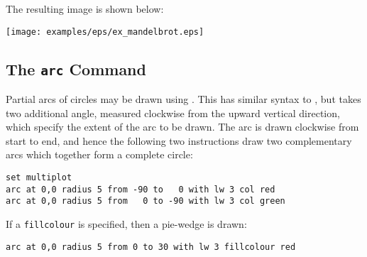 {\newline
{}\newline
\noindent {\tt \phantom{xxx}\} }\newline
{}\newline
\noindent {\tt \phantom{x}\} }\newline
\noindent {\tt }\newline
{}\newline
{}\newline
{}\newline
\nlscf
The resulting image is shown below:
\nlscf
\begin{center}
\texttt{[image: examples/eps/ex\_mandelbrot.eps]}
\end{center}
}

\subsection{The {\tt arc} Command}
\label{sec:arc}

Partial arcs of circles may be drawn using . This has similar
syntax to , but takes two additional angle, measured clockwise
from the upward vertical direction, which specify the extent of the arc to be
drawn. The arc is drawn clockwise from start to end, and hence the following
two instructions draw two complementary arcs which together form a complete
circle:

\begin{verbatim}
set multiplot
arc at 0,0 radius 5 from -90 to   0 with lw 3 col red
arc at 0,0 radius 5 from   0 to -90 with lw 3 col green
\end{verbatim}

\noindent If a {\tt fillcolour} is specified, then a pie-wedge is drawn:

\begin{verbatim}
arc at 0,0 radius 5 from 0 to 30 with lw 3 fillcolour red
\end{verbatim}

